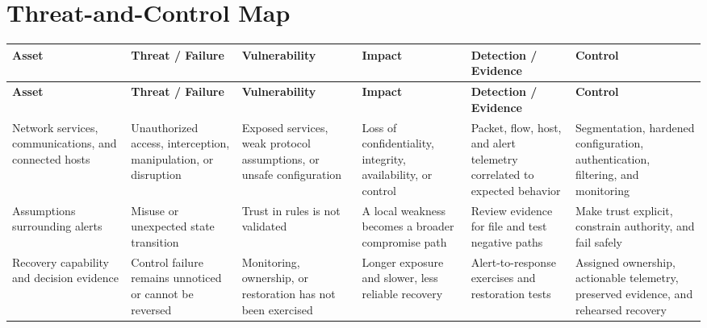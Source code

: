 \documentclass[11pt,letterpaper]{article}
\begin{document}
\section*{Threat-and-Control Map}
\begingroup\scriptsize\setlength{\tabcolsep}{2pt}
\begin{longtable}{>{\raggedright\arraybackslash}p{}>{\raggedright\arraybackslash}p{}>{\raggedright\arraybackslash}p{}>{\raggedright\arraybackslash}p{}>{\raggedright\arraybackslash}p{}>{\raggedright\arraybackslash}p{}}
\toprule\rowcolor{Navy}\color{white}\textbf{Asset} & \color{white}\textbf{Threat / Failure} & \color{white}\textbf{Vulnerability} & \color{white}\textbf{Impact} & \color{white}\textbf{Detection / Evidence} & \color{white}\textbf{Control}\\\midrule
\endfirsthead
\toprule\rowcolor{Navy}\color{white}\textbf{Asset} & \color{white}\textbf{Threat / Failure} & \color{white}\textbf{Vulnerability} & \color{white}\textbf{Impact} & \color{white}\textbf{Detection / Evidence} & \color{white}\textbf{Control}\\\midrule
\endhead
Network services, communications, and connected hosts & Unauthorized access, interception, manipulation, or disruption & Exposed services, weak protocol assumptions, or unsafe configuration & Loss of confidentiality, integrity, availability, or control & Packet, flow, host, and alert telemetry correlated to expected behavior & Segmentation, hardened configuration, authentication, filtering, and monitoring\\\midrule
Assumptions surrounding alerts & Misuse or unexpected state transition & Trust in rules is not validated & A local weakness becomes a broader compromise path & Review evidence for file and test negative paths & Make trust explicit, constrain authority, and fail safely\\\midrule
Recovery capability and decision evidence & Control failure remains unnoticed or cannot be reversed & Monitoring, ownership, or restoration has not been exercised & Longer exposure and slower, less reliable recovery & Alert-to-response exercises and restoration tests & Assigned ownership, actionable telemetry, preserved evidence, and rehearsed recovery\\\midrule
\bottomrule
\end{longtable}
\endgroup
\end{document}
